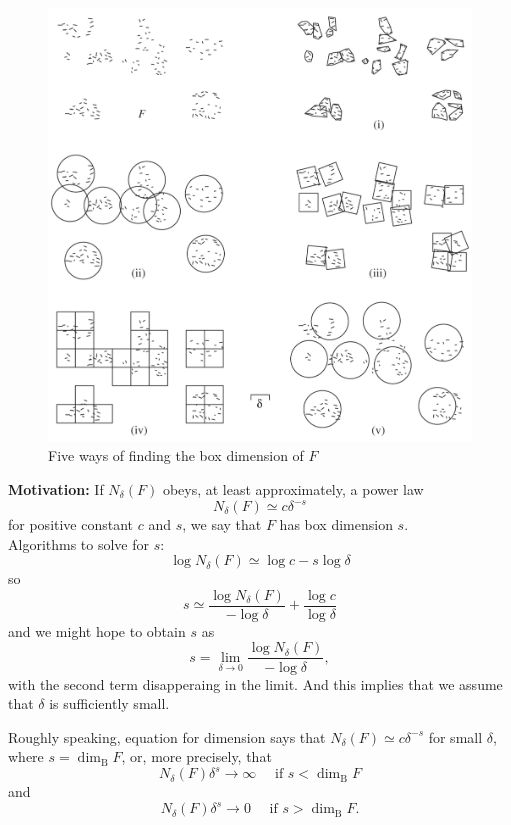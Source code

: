 \begin{figure}[t]
    \centering
    \includegraphics[width=.66\textwidth]{images/bcd-def-vis.png}
    \caption{Five ways of finding the box dimension of $F$}
    \label{fig:bcd-def-vis}
\end{figure}


\textbf{Motivation:}
If $N_\delta(F)$ obeys, at least approximately, a power law
$$N_{\delta}(F) \simeq c \delta^{-s}$$
for positive constant $c$ and $s$, we say that $F$ has box dimension $s$.
\\
Algorithms to solve for $s$:
$$
\log N_{\delta}(F) \simeq \log c-s \log \delta
$$
so
$$
s \simeq \frac{\log N_{\delta}(F)}{-\log \delta}+\frac{\log c}{\log \delta}
$$
and we might hope to obtain $s$ as
$$
s=\lim _{\delta \rightarrow 0} \frac{\log N_{\delta}(F)}{-\log \delta},
$$
with the second term disapperaing in the limit. And this implies that we assume that $\delta$ is sufficiently small. 


Roughly speaking, equation for dimension says that $N_{\delta}(F) \simeq c \delta^{-s}$ for small $\delta$, where $s=\operatorname{dim}_{\mathrm{B}} F$, or, more precisely, that
$$
N_{\delta}(F) \delta^{s} \rightarrow \infty \quad \text { if } s<\operatorname{dim}_{\mathrm{B}} F
$$
and
$$
N_{\delta}(F) \delta^{s} \rightarrow 0 \quad \text { if } s>\operatorname{dim}_{\mathrm{B}} F .
$$

